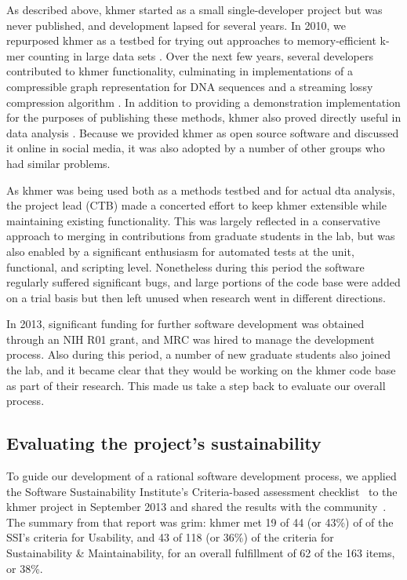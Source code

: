 \documentclass[12pt]{article}
\begin{document}
As described above, khmer started as a small single-developer project
but was never published, and development lapsed for several years.  In
2010, we repurposed khmer as a testbed for trying out approaches to
memory-efficient k-mer counting in large data sets \cite{Zhang2014}.
Over the next few years, several developers contributed to khmer
functionality, culminating in implementations of a compressible
graph representation for DNA sequences and a streaming lossy compression
algorithm \cite{Pell2012} \cite{diginorm}.  In addition to providing a
demonstration implementation for the purposes of publishing these methods,
khmer also proved directly useful in data analysis \cite{Howe14032014}. Because
we provided khmer as open source software and discussed it online in
social media, it was also adopted by a number of other groups who had
similar problems.

As khmer was being used both as a methods testbed and for actual
dta analysis, the project lead (CTB) made a concerted effort to keep
khmer extensible while maintaining existing functionality.  This was
largely reflected in a conservative approach to merging in
contributions from graduate students in the lab, but was also enabled
by a significant enthusiasm for automated tests at the unit,
functional, and scripting level.  Nonetheless during this period the
software regularly suffered significant bugs, and large portions of
the code base were added on a trial basis but then left unused when
research went in different directions.

In 2013, significant funding for further software development was
obtained through an NIH R01 grant, and MRC was hired to manage the
development process. Also during this period, a number of new graduate
students also joined the lab, and it became clear that they would
be working on the khmer code base as part of their research.
This made us take a step back to evaluate our overall process.

\subsection{Evaluating the project's sustainability}

To guide our development of a rational software development process,
we applied the Software Sustainability Institute's Criteria-based
assessment checklist~\cite{SSI-eval-guide} to the khmer project in
September 2013 and shared the results with the
community~\cite{khmer-assessment}. The summary from that report was grim: khmer
met 19 of 44 (or 43\%) of of the SSI's criteria for Usability, and 43
of 118 (or 36\%) of the criteria for Sustainability \& Maintainability, for an 
overall fulfillment of 62 of the 163 items, or 38\%.
\end{document}
